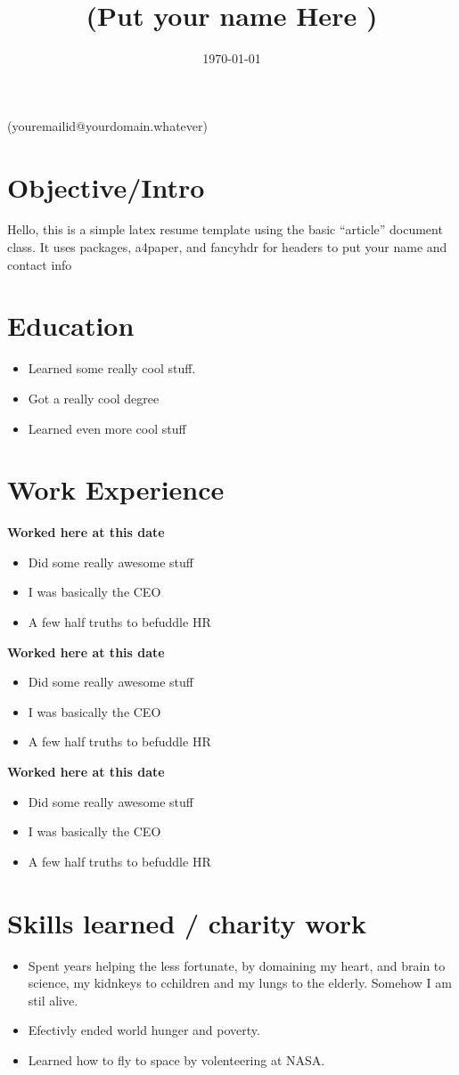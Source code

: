 \documentclass{article}
\title{  (Put your name Here ) }
\begin{document}
\date{\today}

\begin{center} (youremailid@yourdomain.whatever)         \end{center}

\section*{Objective/Intro}
 Hello, this is a simple latex resume template using the basic ``article'' document class.  It uses packages, a4paper, and fancyhdr for headers to put your name and contact info

\section*{Education}
\begin{itemize}
   \item Learned some really cool stuff.
   \item Got a really cool degree
   \item Learned even more cool stuff
\end{itemize}

\section*{Work Experience}
\textbf{Worked here at this date }
\begin{itemize}
   \item Did some really awesome stuff
   \item I was basically the CEO
   \item A few half truths to befuddle HR
\end{itemize}
\textbf{Worked here at this date}
\begin{itemize}
   \item Did some really awesome stuff
   \item I was basically the CEO
   \item A few half truths to befuddle HR
\end{itemize}
\textbf{Worked here at this date}
\begin{itemize}
   \item Did some really awesome stuff
   \item I was basically the CEO
   \item A few half truths to befuddle HR
\end{itemize}

\section*{Skills learned / charity work}
\begin{itemize}
    \item Spent years helping the less fortunate, by domaining my heart, and brain to science, my kidnkeys to cchildren and my lungs to the elderly. Somehow I am stil alive.
    \item Efectivly ended world hunger and poverty.
    \item Learned how to fly to space by volenteering at NASA.
\end{itemize}
  
\end{document}
